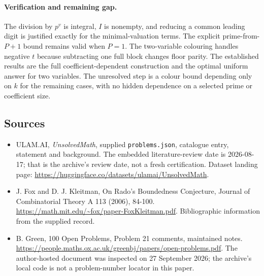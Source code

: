 \documentclass[11pt,a4paper]{article}
\begin{document}
\paragraph{Verification and remaining gap.}
The division by $p^v$ is integral, $I$ is nonempty, and reducing a common leading digit is justified exactly for the minimal-valuation terms. The explicit prime-from-$P+1$ bound remains valid when $P=1$. The two-variable colouring handles negative $t$ because subtracting one full block changes floor parity. The established results are the full coefficient-dependent construction and the optimal uniform answer for two variables. The unresolved step is a colour bound depending only on $k$ for the remaining cases, with no hidden dependence on a selected prime or coefficient size.

\subsection{Sources}

{\small

\begin{itemize}

\item[\hypertarget{source:statement:1}{S1}] ULAM.AI, \emph{UnsolvedMath}, supplied \texttt{problems.json}, catalogue entry, statement and background. The embedded literature-review date is 2026-08-17; that is the archive’s review date, not a fresh certification. Dataset landing page: \url{https://huggingface.co/datasets/ulamai/UnsolvedMath}.

\item[\hypertarget{source:statement:2}{S2}] J. Fox and D. J. Kleitman, On Rado's Boundedness Conjecture, Journal of Combinatorial Theory A 113 (2006), 84-100. \url{https://math.mit.edu/~fox/paper-FoxKleitman.pdf}. Bibliographic information from the supplied record.

\item[\hypertarget{source:statement:3}{S3}] B. Green, 100 Open Problems, Problem 21 comments, maintained notes. \url{https://people.maths.ox.ac.uk/greenbj/papers/open-problems.pdf}. The author-hosted document was inspected on 27 September 2026; the archive’s local code is not a problem-number locator in this paper.

\end{itemize}

}

\label{end:statement}
\end{document}
